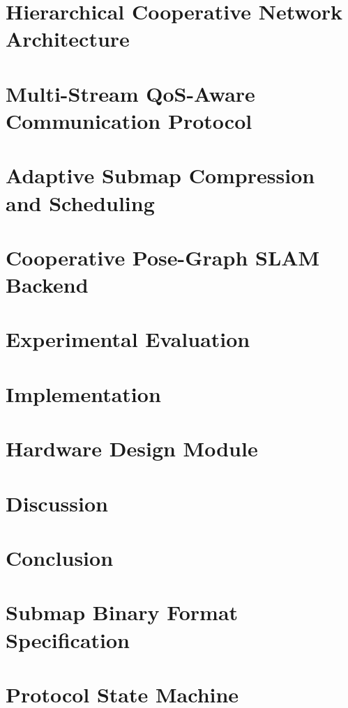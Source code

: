 \documentclass[sigconf, 10pt, review, anonymous]{acmart}
\begin{document}
\section{Hierarchical Cooperative Network Architecture}


\section{Multi-Stream QoS-Aware Communication Protocol}


\section{Adaptive Submap Compression and Scheduling}


\section{Cooperative Pose-Graph SLAM Backend}


\section{Experimental Evaluation}


\section{Implementation}


\section{Hardware Design Module}


\section{Discussion}


\section{Conclusion}





\appendix
\section{Submap Binary Format Specification}

\section{Protocol State Machine}

\end{document}
